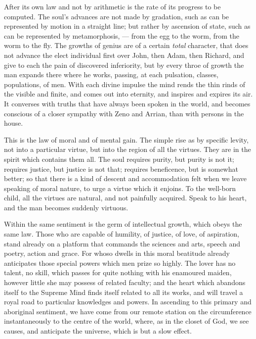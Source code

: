 \documentclass{article}
\begin{document}
After its own law and not by arithmetic is the rate of its progress to be computed. The soul's advances are not made by gradation, such as can be represented by motion in a straight line; but rather by ascension of state, such as can be represented by metamorphosis, --- from the egg to the worm, from the worm to the fly. The growths of genius are of a certain \emph{total} character, that does not advance the elect individual first over John, then Adam, then Richard, and give to each the pain of discovered inferiority, but by every throe of growth the man expands there where he works, passing, at each pulsation, classes, populations, of men. With each divine impulse the mind rends the thin rinds of the visible and finite, and comes out into eternity, and inspires and expires its air. It converses with truths that have always been spoken in the world, and becomes conscious of a closer sympathy with Zeno and Arrian, than with persons in the house.

This is the law of moral and of mental gain. The simple rise as by specific levity, not into a particular virtue, but into the region of all the virtues. They are in the spirit which contains them all. The soul requires purity, but purity is not it; requires justice, but justice is not that; requires beneficence, but is somewhat better; so that there is a kind of descent and accommodation felt when we leave speaking of moral nature, to urge a virtue which it enjoins. To the well-born child, all the virtues are natural, and not painfully acquired. Speak to his heart, and the man becomes suddenly virtuous.

Within the same sentiment is the germ of intellectual growth, which obeys the same law. Those who are capable of humility, of justice, of love, of aspiration, stand already on a platform that commands the sciences and arts, speech and poetry, action and grace. For whoso dwells in this moral beatitude already anticipates those special powers which men prize so highly. The lover has no talent, no skill, which passes for quite nothing with his enamoured maiden, however little she may possess of related faculty; and the heart which abandons itself to the Supreme Mind finds itself related to all its works, and will travel a royal road to particular knowledges and powers. In ascending to this primary and aboriginal sentiment, we have come from our remote station on the circumference instantaneously to the centre of the world, where, as in the closet of God, we see causes, and anticipate the universe, which is but a slow effect.
\end{document}
